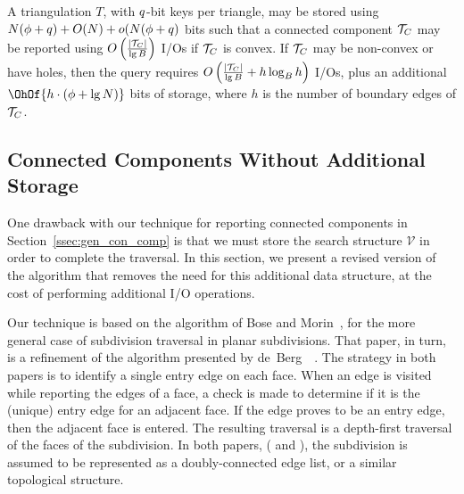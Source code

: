   \begin{theorem}\label{thm:conn_comp}
  A triangulation $T$, with $q$-bit keys per triangle, may be 
  stored using 
  $N(\phi + q) + O(N) + o(N(\phi + q)$ 
  bits such that a 
  connected component ${\mathcal{T}}_C$ may be reported using 
  $O \left( \frac{|{\mathcal{T}}_C|}{\lg{B}} \right)$ I/Os if ${\mathcal{T}}_C$
  is convex.  
  If ${\mathcal{T}}_C$ may be non-convex or have holes, then the query requires 
  $O\left( \frac{|{\mathcal{T}}_C|}{\lg{B}}  + h \log_B{h}\right)$ 
  I/Os, plus an additional $\OhOf{h \cdot(\bitsPerPoint + \lg{N})}$ bits of storage, 
  where $h$ is the number of boundary edges of 
  ${\mathcal{T}}_C$.
  \end{theorem}

  \subsection{Connected Components Without Additional Storage}
  \label{ssec:no_add_storage}

  One drawback with our technique for reporting connected components 
  in Section~\ref{ssec:gen_con_comp} is that 
  we must store the search structure $\mathcal{V}$ in order to complete the 
  traversal. 
  In this section, we present a revised version of the algorithm that removes 
  the need for this additional data structure, at the cost of performing 
  additional I/O operations.

  Our technique is based on the algorithm of Bose and 
  Morin~\cite{DBLP:conf/isaac/BoseM00}, for the more general case of subdivision 
  traversal in planar subdivisions. 
  That paper, in turn, is a refinement of the algorithm presented by 
  de~Berg~\etal~\cite{deberg_et_al_1997}. 
  The strategy in both papers is to identify a single entry edge on each face. 
  When an edge is visited while reporting the edges of a face, a check is made 
  to determine if it is the (unique) entry edge for an adjacent face. 
  If the edge proves to be an entry edge, then the adjacent face is entered. 
  The resulting traversal is a depth-first traversal of the faces of the 
  subdivision. 
  In both papers, (\cite{DBLP:conf/isaac/BoseM00} and \cite{deberg_et_al_1997}),
  the subdivision is assumed 
  to be represented as a doubly-connected edge list, or a similar 
  topological structure. 

